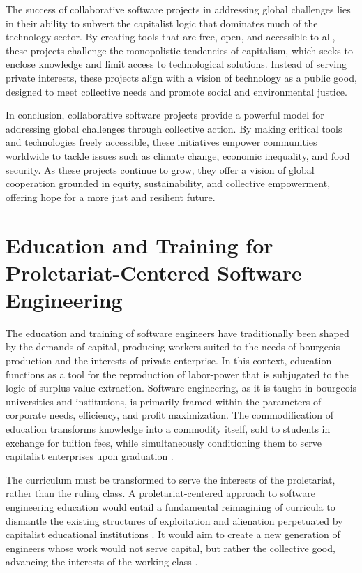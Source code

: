 \begin{refsection}
The success of collaborative software projects in addressing global challenges lies in their ability to subvert the capitalist logic that dominates much of the technology sector. By creating tools that are free, open, and accessible to all, these projects challenge the monopolistic tendencies of capitalism, which seeks to enclose knowledge and limit access to technological solutions. Instead of serving private interests, these projects align with a vision of technology as a public good, designed to meet collective needs and promote social and environmental justice.

In conclusion, collaborative software projects provide a powerful model for addressing global challenges through collective action. By making critical tools and technologies freely accessible, these initiatives empower communities worldwide to tackle issues such as climate change, economic inequality, and food security. As these projects continue to grow, they offer a vision of global cooperation grounded in equity, sustainability, and collective empowerment, offering hope for a more just and resilient future.

\section{Education and Training for Proletariat-Centered Software Engineering}

The education and training of software engineers have traditionally been shaped by the demands of capital, producing workers suited to the needs of bourgeois production and the interests of private enterprise. In this context, education functions as a tool for the reproduction of labor-power that is subjugated to the logic of surplus value extraction. Software engineering, as it is taught in bourgeois universities and institutions, is primarily framed within the parameters of corporate needs, efficiency, and profit maximization. The commodification of education transforms knowledge into a commodity itself, sold to students in exchange for tuition fees, while simultaneously conditioning them to serve capitalist enterprises upon graduation \cite[pp.~322]{marx2008capital}.

The curriculum must be transformed to serve the interests of the proletariat, rather than the ruling class. A proletariat-centered approach to software engineering education would entail a fundamental reimagining of curricula to dismantle the existing structures of exploitation and alienation perpetuated by capitalist educational institutions \cite[pp.~56]{braverman1974labor}. It would aim to create a new generation of engineers whose work would not serve capital, but rather the collective good, advancing the interests of the working class \cite[pp.~68]{engels1987condition}.


\end{refsection}
